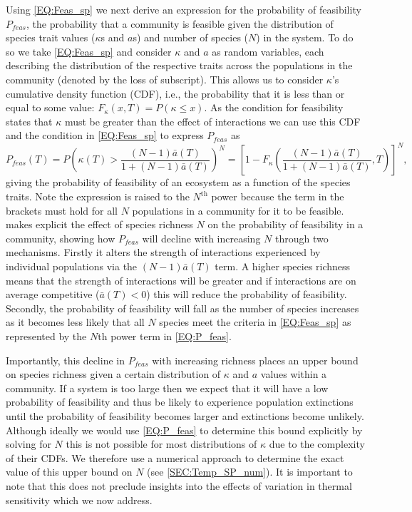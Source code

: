\documentclass{article}
\begin{document}
Using \cref{EQ:Feas_sp} we next derive an expression for the probability of feasibility $P_{feas}$, the probability that a community is feasible given the distribution of species trait values ($\kappa$s and $a$s) and number of species ($N$) in the system. To do so we take \cref{EQ:Feas_sp} and consider $\kappa$ and $a$ as random variables, each describing the distribution of the respective traits across the populations in the community (denoted by the loss of subscript). This allows us to consider $\kappa$'s cumulative density function (CDF), i.e., the probability that it is less than or equal to some value: $F_{\kappa}(x,T) = P(\kappa \leq x)$. As the condition for feasibility states that $\kappa$ must be greater than the effect of interactions we can use this CDF and the condition in \cref{EQ:Feas_sp} to express $P_{feas}$ as
\begin{equation} \label{EQ:P_feas}
    P_{feas}(T) = P \left( \kappa(T) > \frac{(N-1)\bar{a}(T)}{1 + (N-1)\bar{a}(T)}  \right)^N = 
    \left[1 - F_{\kappa}\left(\frac{(N-1)\bar{a}(T)}{1 + (N-1)\bar{a}(T)},T \right)\right]^N,
\end{equation}
giving the probability of feasibility of an ecosystem as a function of the species traits. Note the expression is raised to the $N^\text{th}$ power because the term in the brackets must hold for all $N$ populations in a community for it to be feasible.  makes explicit the effect of species richness $N$ on the probability of feasibility in a community, showing how $P_{feas}$ will decline with increasing $N$ through two mechanisms. Firstly it alters the strength of interactions experienced by individual populations via the $(N-1) \bar{a}(T)$ term. A higher species richness means that the strength of interactions will be greater and if interactions are on average competitive ($\bar{a}(T) < 0$) this will reduce the probability of feasibility. Secondly, the probability of feasibility will fall as the number of species increases as it becomes less likely that all $N$ species meet the criteria in \cref{EQ:Feas_sp} as represented by the $N\text{th}$ power term in \cref{EQ:P_feas}. 

Importantly, this decline in $P_{feas}$ with increasing richness places an upper bound on species richness given a certain distribution of $\kappa$ and $a$ values within a community. If a system is too large then we expect that it will have a low probability of feasibility and thus be likely to experience population extinctions until the probability of feasibility becomes larger and extinctions become unlikely. Although ideally we would use \cref{EQ:P_feas} to determine this bound explicitly by solving for $N$ this is not possible for most distributions of $\kappa$ due to the complexity of their CDFs. We therefore use a numerical approach to determine the exact value of this upper bound on $N$ (see \cref{SEC:Temp_SP_num}). It is important to note that this does not preclude insights into the effects of variation in thermal sensitivity which we now address. 
\end{document}
